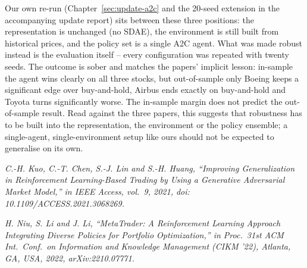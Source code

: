 Our own re-run (Chapter~\ref{sec:update-a2c} and the 20-seed extension in the accompanying
update report) sits between these three positions: the representation is unchanged (no
SDAE), the environment is still built from historical prices, and the policy set is a single
A2C agent. What was made robust instead is the evaluation itself -- every configuration was
repeated with twenty seeds. The outcome is sober and matches the papers' implicit lesson:
in-sample the agent wins clearly on all three stocks, but out-of-sample only Boeing keeps a
significant edge over buy-and-hold, Airbus ends exactly on buy-and-hold and Toyota turns
significantly worse. The in-sample margin does not predict the out-of-sample result. Read
against the three papers, this suggests that robustness has to be built into the
representation, the environment or the policy ensemble; a single-agent, single-environment
setup like ours should not be expected to generalise on its own.

\noindent\textit{C.-H. Kuo, C.-T. Chen, S.-J. Lin and S.-H. Huang, ``Improving Generalization
in Reinforcement Learning-Based Trading by Using a Generative Adversarial Market Model,'' in
IEEE Access, vol.~9, 2021, doi: 10.1109/ACCESS.2021.3068269.}

\noindent\textit{H. Niu, S. Li and J. Li, ``MetaTrader: A Reinforcement Learning Approach
Integrating Diverse Policies for Portfolio Optimization,'' in Proc.\ 31st ACM Int.\ Conf.\ on
Information and Knowledge Management (CIKM '22), Atlanta, GA, USA, 2022,
arXiv:2210.07771.}
